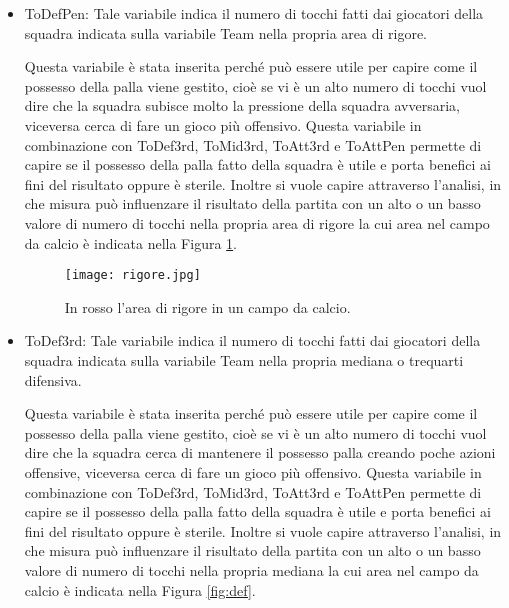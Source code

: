 \begin{itemize}
	\item \textsf{ToDefPen}: Tale variabile indica il numero di tocchi fatti dai giocatori della squadra indicata sulla variabile \textsf{Team} nella propria area di rigore. 
	
	Questa variabile è stata inserita perché può essere utile per capire come il possesso della palla viene gestito, cioè se vi è un alto numero di tocchi vuol dire che la squadra subisce molto la pressione della squadra avversaria, viceversa cerca di fare un gioco più offensivo. Questa variabile in combinazione con \textsf{ToDef3rd}, \textsf{ToMid3rd}, \textsf{ToAtt3rd} e \textsf{ToAttPen} permette di capire se il possesso della palla fatto della squadra è utile e porta benefici ai fini del risultato oppure è sterile. Inoltre si vuole capire attraverso l'analisi, in che misura può influenzare il risultato della partita con un alto o un basso valore di numero di tocchi nella propria area di rigore la cui area nel campo da calcio è indicata nella Figura \ref{fig:penalty}.
	
	\begin{figure}[!ht]
		\begin{center}
			\texttt{[image: rigore.jpg]}
			\caption{In rosso l'area di rigore in un campo da calcio.}
			\label{fig:penalty}
		\end{center}
	\end{figure}
	
	
	\item \textsf{ToDef3rd}: Tale variabile indica il numero di tocchi fatti dai giocatori della squadra indicata sulla variabile \textsf{Team} nella propria mediana o trequarti difensiva. 
	
	Questa variabile è stata inserita perché può essere utile per capire come il possesso della palla viene gestito, cioè se vi è un alto numero di tocchi vuol dire che la squadra cerca di mantenere il possesso palla creando poche azioni offensive, viceversa cerca di fare un gioco più offensivo. Questa variabile in combinazione con \textsf{ToDef3rd}, \textsf{ToMid3rd}, \textsf{ToAtt3rd} e \textsf{ToAttPen} permette di capire se il possesso della palla fatto della squadra è utile e porta benefici ai fini del risultato oppure è sterile. Inoltre si vuole capire attraverso l'analisi, in che misura può influenzare il risultato della partita con un alto o un basso valore di numero di tocchi nella propria mediana la cui area nel campo da calcio è indicata nella Figura \ref{fig:def}.
	

\end{itemize}
